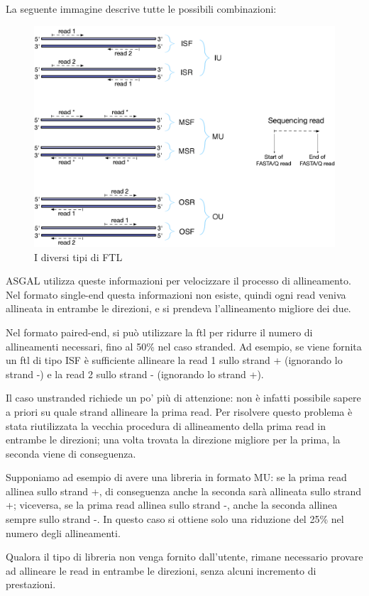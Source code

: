 La seguente immagine descrive tutte le possibili combinazioni:
\begin{figure}[h]
	\centering
	\includegraphics[width=\linewidth]{images/fragmentlibrarytypes.png}
  \caption{I diversi tipi di FTL}
  \label{fig:FragmentLibraryTypes}
\end{figure}

\newpage

ASGAL utilizza queste informazioni per velocizzare il processo di allineamento. Nel formato single-end questa informazioni non esiste, quindi ogni read veniva allineata in entrambe le direzioni, e si prendeva l'allineamento migliore dei due. 

Nel formato paired-end, si può utilizzare la ftl per ridurre il numero di allineamenti necessari, fino al 50\% nel caso stranded. Ad esempio, se viene fornita un ftl di tipo ISF è sufficiente allineare la read 1 sullo strand + (ignorando lo strand -) e la read 2 sullo strand - (ignorando lo strand +).

Il caso unstranded richiede un po' più di attenzione: non è infatti possibile sapere a priori su quale strand allineare la prima read. Per risolvere questo problema è stata riutilizzata la vecchia procedura di allineamento della prima read in entrambe le direzioni; una volta trovata la direzione migliore per la prima, la seconda viene di conseguenza. 

Supponiamo ad esempio di avere una libreria in formato MU: se la prima read allinea sullo strand +, di conseguenza anche la seconda sarà allineata sullo strand +; viceversa, se la prima read allinea sullo strand -, anche la seconda allinea sempre sullo strand -. In questo caso si ottiene solo una riduzione del 25\% nel numero degli allineamenti.

Qualora il tipo di libreria non venga fornito dall'utente, rimane necessario provare ad allineare le read in entrambe le direzioni, senza alcuni incremento di prestazioni.


